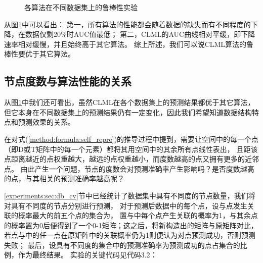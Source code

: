 \begin{figure}
    \centering
    \caption{各算法在不同数据集上的鲁棒性实验}
    \label{experiments:fig:robust}
\end{figure}


从图\ref{experiments:fig:robust}中可以看出：
第一，所有算法的性能都会随着数据的缺失而有不同程度的下降，在数据仅剩20\%时AUC值最低；
第二，CLML的AUC曲线相对平缓，即下降速率相对缓慢，并且始终高于其它算法。
综上所述，我们可以说CLML算法的鲁棒性要优于其它算法。

\subsection{节点度数与算法性能的关系}
从图\ref{experiments:fig:robust}中我们还可看出，虽然CLML在各个数据集上的预测结果都优于其它算法，
但它本身在不同数据集上的预测结果仍有一定变化，因此我们希望知道数据结构特点和预测效果的关系。


在对式(\ref{method:formula:self_repre})的推导过程中提到，需要让空间中的每一个点（即D或T矩阵中的每一个元素）都将其用空间中的其余所有点线性表出，
且距该点距离越近的点权重越大，越远的点权重越小，而度数越高的点又拥有更多的近邻点。
由此产生一个问题，节点的度数会对预测准确率产生影响吗？是否度数越高的点，与其相关的预测准确率越高呢？


\ref{experiments:sec:db_cv}节中已经统计了数据集中具有不同度的节点数量，我们将对具有不同度的节点分别进行预测，
对于预测后数据中的每个点，设与点发生关联的概率最大的前五个点的集合为，
置与中每个点产生关联的概率为1，与其余点的概率置为0后便得到了一个0-1矩阵；这之后，将新构造出的矩阵与原矩阵对比，
若点与中的任一点在原矩阵中的关联概率仍为1则便认为对点预测成功，否则预测失败；
最后，设具有不同度的集合中的预测准确率为预测成功的点占集合的比例，作为最终结果。
实验的关键代码见代码3.2：



